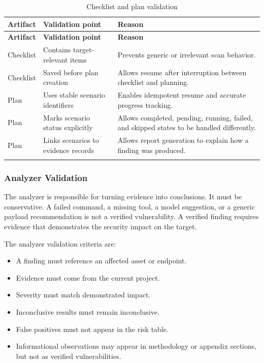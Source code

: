 \documentclass[12pt,a4paper]{report}
\begin{document}
\begin{longtable}{|p{}|p{}|p{}|}
\hline
\textbf{Artifact} & \textbf{Validation point} & \textbf{Reason} \\
\hline
\endfirsthead
\hline
\textbf{Artifact} & \textbf{Validation point} & \textbf{Reason} \\
\hline
\endhead
Checklist & Contains target-relevant items & Prevents generic or irrelevant scan
behavior. \\
\hline
Checklist & Saved before plan creation & Allows resume after interruption between
checklist and planning. \\
\hline
Plan & Uses stable scenario identifiers & Enables idempotent resume and accurate
progress tracking. \\
\hline
Plan & Marks scenario status explicitly & Allows completed, pending, running, failed,
and skipped states to be handled differently. \\
\hline
Plan & Links scenarios to evidence records & Allows report generation to explain how a
finding was produced. \\
\hline
\caption{Checklist and plan validation}
\label{tab:checklist_plan_validation}
\end{longtable}

\subsubsection{Analyzer Validation}

The analyzer is responsible for turning evidence into conclusions. It must be
conservative. A failed command, a missing tool, a model suggestion, or a generic payload
recommendation is not a verified vulnerability. A verified finding requires evidence
that demonstrates the security impact on the target.

The analyzer validation criteria are:

\begin{itemize}
    \item A finding must reference an affected asset or endpoint.
    \item Evidence must come from the current project.
    \item Severity must match demonstrated impact.
    \item Inconclusive results must remain inconclusive.
    \item False positives must not appear in the risk table.
    \item Informational observations may appear in methodology or appendix sections,
    but not as verified vulnerabilities.
\end{itemize}
\end{document}
